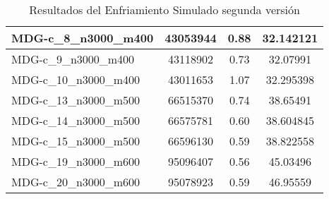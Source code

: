 \documentclass[11pt,a4paper]{article}
\begin{document}
\begin{table}[H]
\begin{center}
\begin{tabular}{|l|c|c|c|}
		MDG-c\_8\_n3000\_m400 & 43053944 & 0.88 & 32.142121 \\ \hline
		MDG-c\_9\_n3000\_m400 & 43118902 & 0.73 & 32.07991 \\ \hline
		MDG-c\_10\_n3000\_m400 & 43011653 & 1.07 & 32.295398 \\ \hline
		MDG-c\_13\_n3000\_m500 & 66515370 & 0.74 & 38.65491 \\ \hline
		MDG-c\_14\_n3000\_m500 & 66575781 & 0.60 & 38.604845 \\ \hline
		MDG-c\_15\_n3000\_m500 & 66596130 & 0.59 & 38.822558 \\ \hline
		MDG-c\_19\_n3000\_m600 & 95096407 & 0.56 & 45.03496 \\ \hline
		MDG-c\_20\_n3000\_m600 & 95078923 & 0.59 & 46.95559 \\ \hline
	\end{tabular}
	\caption{Resultados del Enfriamiento Simulado segunda versión}
	\label{}
	\end{center}
\end{table}
\end{document}
